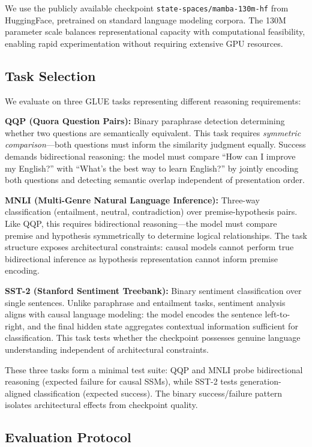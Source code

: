 We use the publicly available checkpoint \texttt{state-spaces/mamba-130m-hf} from HuggingFace, pretrained on standard language modeling corpora. The 130M parameter scale balances representational capacity with computational feasibility, enabling rapid experimentation without requiring extensive GPU resources.

\subsection{Task Selection}

We evaluate on three GLUE tasks representing different reasoning requirements:

\textbf{QQP (Quora Question Pairs):} Binary paraphrase detection determining whether two questions are semantically equivalent. This task requires \textit{symmetric comparison}---both questions must inform the similarity judgment equally. Success demands bidirectional reasoning: the model must compare ``How can I improve my English?'' with ``What's the best way to learn English?'' by jointly encoding both questions and detecting semantic overlap independent of presentation order.

\textbf{MNLI (Multi-Genre Natural Language Inference):} Three-way classification (entailment, neutral, contradiction) over premise-hypothesis pairs. Like QQP, this requires bidirectional reasoning---the model must compare premise and hypothesis symmetrically to determine logical relationships. The task structure exposes architectural constraints: causal models cannot perform true bidirectional inference as hypothesis representation cannot inform premise encoding.

\textbf{SST-2 (Stanford Sentiment Treebank):} Binary sentiment classification over single sentences. Unlike paraphrase and entailment tasks, sentiment analysis aligns with causal language modeling: the model encodes the sentence left-to-right, and the final hidden state aggregates contextual information sufficient for classification. This task tests whether the checkpoint possesses genuine language understanding independent of architectural constraints.

These three tasks form a minimal test suite: QQP and MNLI probe bidirectional reasoning (expected failure for causal SSMs), while SST-2 tests generation-aligned classification (expected success). The binary success/failure pattern isolates architectural effects from checkpoint quality.

\subsection{Evaluation Protocol}

